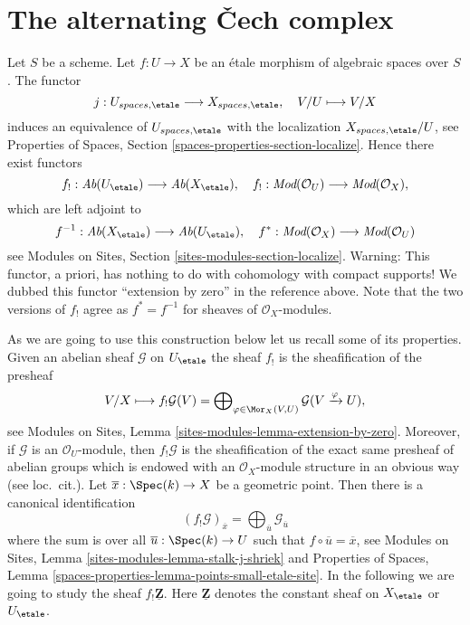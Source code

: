 \section{The alternating {\v C}ech complex}
\label{section-alternating-cech}

\noindent
Let $S$ be a scheme. Let $f : U \to X$ be an \'etale morphism of algebraic
spaces over $S$. The functor
$$
j : U_{spaces, \etale} \longrightarrow X_{spaces, \etale},\quad
V/U \longmapsto V/X
$$
induces an equivalence of $U_{spaces, \etale}$ with the localization
$X_{spaces, \etale}/U$, see
Properties of Spaces, Section \ref{spaces-properties-section-localize}.
Hence there exist functors
$$
f_! : \textit{Ab}(U_\etale) \longrightarrow
\textit{Ab}(X_\etale),\quad
f_! : \textit{Mod}(\mathcal{O}_U) \longrightarrow \textit{Mod}(\mathcal{O}_X),
$$
which are left adjoint to
$$
f^{-1} : \textit{Ab}(X_\etale) \longrightarrow
\textit{Ab}(U_\etale),\quad
f^* : \textit{Mod}(\mathcal{O}_X) \longrightarrow \textit{Mod}(\mathcal{O}_U)
$$
see
Modules on Sites, Section \ref{sites-modules-section-localize}.
Warning: This functor, a priori, has
nothing to do with cohomology with compact supports!
We dubbed this functor ``extension by zero'' in the reference above.
Note that the two versions of $f_!$ agree as $f^* = f^{-1}$ for
sheaves of $\mathcal{O}_X$-modules.

\medskip\noindent
As we are going to use this construction below let us recall some of its
properties. Given an abelian sheaf $\mathcal{G}$ on $U_\etale$
the sheaf $f_!$ is the sheafification of the presheaf
$$
V/X \longmapsto
f_!\mathcal{G}(V) =
\bigoplus\nolimits_{\varphi \in \Mor_X(V, U)}
\mathcal{G}(V \xrightarrow{\varphi} U),
$$
see
Modules on Sites, Lemma \ref{sites-modules-lemma-extension-by-zero}.
Moreover, if $\mathcal{G}$ is an $\mathcal{O}_U$-module, then $f_!\mathcal{G}$
is the sheafification of the exact same presheaf of abelian groups which
is endowed with an $\mathcal{O}_X$-module structure in an obvious way
(see loc.\ cit.). Let $\overline{x} : \Spec(k) \to X$
be a geometric point. Then there is a canonical identification
$$
(f_!\mathcal{G})_{\overline{x}} =
\bigoplus\nolimits_{\overline{u}} \mathcal{G}_{\overline{u}}
$$
where the sum is over all $\overline{u} : \Spec(k) \to U$ such that
$f \circ \overline{u} = \overline{x}$, see
Modules on Sites, Lemma \ref{sites-modules-lemma-stalk-j-shriek}
and
Properties of Spaces, Lemma
\ref{spaces-properties-lemma-points-small-etale-site}.
In the following we are going to study the sheaf $f_!\underline{\mathbf{Z}}$.
Here $\underline{\mathbf{Z}}$ denotes the constant sheaf on
$X_\etale$ or $U_\etale$.

